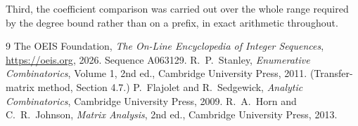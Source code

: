\documentclass[11pt,a4paper]{article}
\theoremstyle{plain}
\theoremstyle{definition}
\begin{document}
Third, the coefficient comparison was carried out over the whole range required by the degree
bound rather than on a prefix, in exact arithmetic throughout.

\begin{thebibliography}{9}
 The OEIS Foundation, \emph{The On-Line Encyclopedia of Integer
Sequences}, \url{https://oeis.org}, 2026. Sequence A063129.
 R.~P.~Stanley, \emph{Enumerative Combinatorics}, Volume 1, 2nd ed.,
Cambridge University Press, 2011. (Transfer-matrix method, Section 4.7.)
 P.~Flajolet and R.~Sedgewick, \emph{Analytic Combinatorics}, Cambridge
University Press, 2009.
 R.~A.~Horn and C.~R.~Johnson, \emph{Matrix Analysis}, 2nd ed., Cambridge
University Press, 2013.
\end{thebibliography}
\end{document}
